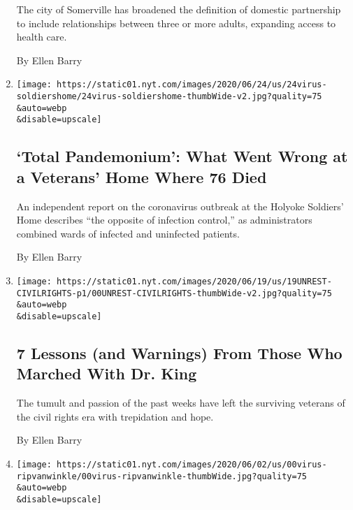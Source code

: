 \begin{enumerate}
  The city of Somerville has broadened the definition of domestic
  partnership to include relationships between three or more adults,
  expanding access to health care.

  By Ellen Barry
\item
  \href{/2020/06/24/us/holyoke-soldiers-home.html}{}

  \texttt{[image: https://static01.nyt.com/images/2020/06/24/us/24virus-soldiershome/24virus-soldiershome-thumbWide-v2.jpg?quality=75\\\&auto=webp\\\&disable=upscale]}

  \hypertarget{total-pandemonium-what-went-wrong-at-a-veterans-home-where-76-died}{%
  \subsection{`Total Pandemonium': What Went Wrong at a Veterans' Home
  Where 76
  Died}\label{total-pandemonium-what-went-wrong-at-a-veterans-home-where-76-died}}

  An independent report on the coronavirus outbreak at the Holyoke
  Soldiers' Home describes ``the opposite of infection control,'' as
  administrators combined wards of infected and uninfected patients.

  By Ellen Barry
\item
  \href{/2020/06/17/us/george-floyd-protests.html}{}

  \texttt{[image: https://static01.nyt.com/images/2020/06/19/us/19UNREST-CIVILRIGHTS-p1/00UNREST-CIVILRIGHTS-thumbWide-v2.jpg?quality=75\\\&auto=webp\\\&disable=upscale]}

  \hypertarget{7-lessons-and-warnings-from-those-who-marched-with-dr-king}{%
  \subsection{7 Lessons (and Warnings) From Those Who Marched With Dr.
  King}\label{7-lessons-and-warnings-from-those-who-marched-with-dr-king}}

  The tumult and passion of the past weeks have left the surviving
  veterans of the civil rights era with trepidation and hope.

  By Ellen Barry
\item
  \href{/2020/06/02/us/coronavirus-meditation.html}{}

  \texttt{[image: https://static01.nyt.com/images/2020/06/02/us/00virus-ripvanwinkle/00virus-ripvanwinkle-thumbWide.jpg?quality=75\\\&auto=webp\\\&disable=upscale]}

  \hypertarget{did-i-miss-anything-a-man-emerges-from-a-75-day-silent-retreat}{%
}
\end{enumerate}
